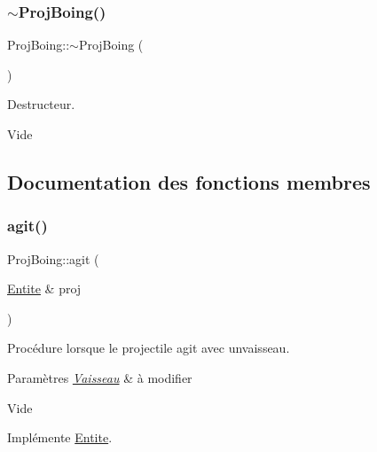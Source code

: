 \mbox{\label{class_proj_boing_a3b5745800aa7ce95337b6e89f06d2d43}} 
\subsubsection{\texorpdfstring{$\sim$\+Proj\+Boing()}{~ProjBoing()}}
{\footnotesize\ttfamily Proj\+Boing\+::$\sim$\+Proj\+Boing (\begin{DoxyParamCaption}{ }\end{DoxyParamCaption})}



Destructeur. 

Vide 

\subsection{Documentation des fonctions membres}
\mbox{\label{class_proj_boing_acbee1a0aa00582682ce755e1b19d687a}} 
\subsubsection{\texorpdfstring{agit()}{agit()}}
{\footnotesize\ttfamily Proj\+Boing\+::agit (\begin{DoxyParamCaption}\item[{\hyperlink{class_entite}{Entite} \&}]{proj }\end{DoxyParamCaption})\hspace{0.3cm}{\ttfamily [virtual]}}



Procédure lorsque le projectile agit avec unvaisseau. 


\begin{DoxyParams}{Paramètres}
{\em \hyperlink{class_vaisseau}{Vaisseau}} & à modifier\\
\hline
\end{DoxyParams}
Vide 

Implémente \hyperlink{class_entite_a848ec47afac1d7ba970a2bcab5dc7b3b}{Entite}.

\mbox{\label{class_proj_boing_aab0f3ea007483e26c38bd9f861954dae}} 

